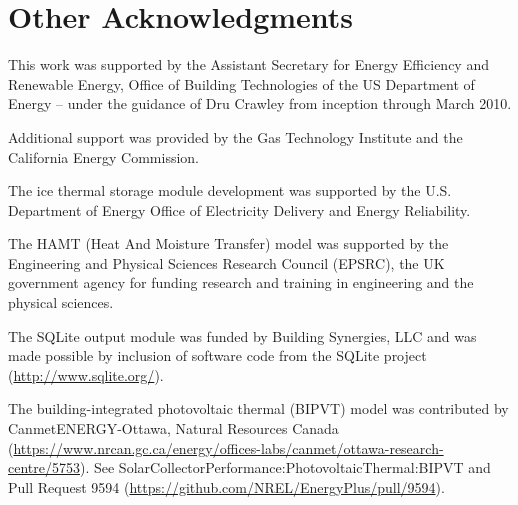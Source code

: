 \section{Other Acknowledgments}\label{other-acknowledgments}

This work was supported by the Assistant Secretary for Energy Efficiency and Renewable Energy, Office of Building Technologies of the US Department of Energy -- under the guidance of Dru Crawley from inception through March 2010.

Additional support was provided by the Gas Technology Institute and the California Energy Commission.

The ice thermal storage module development was supported by the U.S. Department of Energy Office of Electricity Delivery and Energy Reliability.

The HAMT (Heat And Moisture Transfer) model was supported by the Engineering and Physical Sciences Research Council (EPSRC), the UK government agency for funding research and training in engineering and the physical sciences.

The SQLite output module was funded by Building Synergies, LLC and was made possible by inclusion of software code from the SQLite project (\url{http://www.sqlite.org/}).

The building-integrated photovoltaic thermal (BIPVT) model was contributed by CanmetENERGY-Ottawa, Natural Resources Canada (\url{https://www.nrcan.gc.ca/energy/offices-labs/canmet/ottawa-research-centre/5753}). See SolarCollectorPerformance:PhotovoltaicThermal:BIPVT and Pull Request 9594 (\url{https://github.com/NREL/EnergyPlus/pull/9594}).
